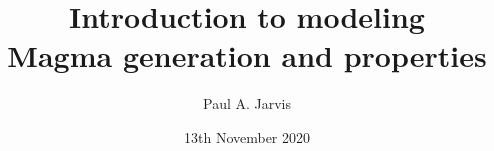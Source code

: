 \documentclass{beamer}
\title[Modeling volcanic processes]{Introduction to modeling \\ Magma generation and properties} %
\author[Paul Jarvis]{Paul A. Jarvis} %
\institute[UNIGE] %
{
\textit{paul.jarvis@unige.ch} %
}
\date{13th November 2020} %
\begin{document}
\begin{frame}
\titlepage %
\end{frame}





\end{document}
